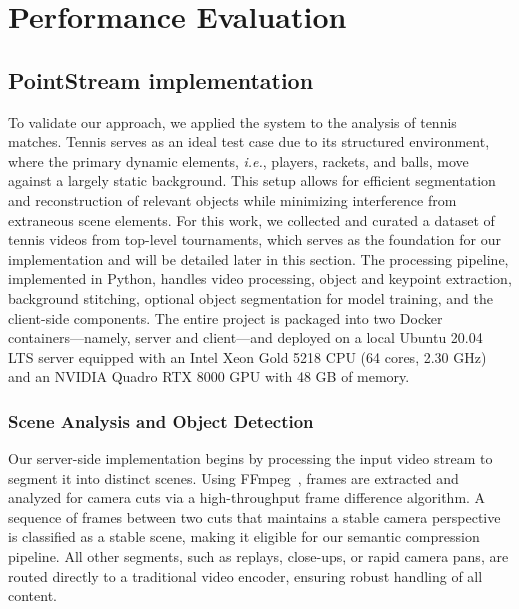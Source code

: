 \documentclass[manuscript, screen]{acmart}
\newcommand{\ie}{\emph{i.e.}, }
\begin{document}
\section{Performance Evaluation}

\subsection{PointStream implementation}
To validate our approach, we applied the system to the analysis of tennis matches.
Tennis serves as an ideal test case due to its structured environment, where the primary dynamic elements, \ie players, rackets, and balls, move against a largely static background. 
This setup allows for efficient segmentation and reconstruction of relevant objects while minimizing interference from extraneous scene elements.
For this work, we collected and curated a dataset of tennis videos from top-level tournaments, which serves as the foundation for our implementation and will be detailed later in this section.
The processing pipeline, implemented in Python, handles video processing, object and keypoint extraction, background stitching, optional object segmentation for model training, and the client-side components.
The entire project is packaged into two Docker~\cite{merkel2014docker} containers—namely, server and client—and deployed on a local Ubuntu 20.04 LTS server equipped with an Intel Xeon Gold 5218 CPU (64 cores, 2.30 GHz) and an NVIDIA Quadro RTX 8000 GPU with 48 GB of memory.


\subsubsection{Scene Analysis and Object Detection}
Our server-side implementation begins by processing the input video stream to segment it into distinct scenes. Using FFmpeg~\cite{ffmpeg}, frames are extracted and analyzed for camera cuts via a high-throughput frame difference algorithm. A sequence of frames between two cuts that maintains a stable camera perspective is classified as a stable scene, making it eligible for our semantic compression pipeline. All other segments, such as replays, close-ups, or rapid camera pans, are routed directly to a traditional video encoder, ensuring robust handling of all content.
\end{document}
